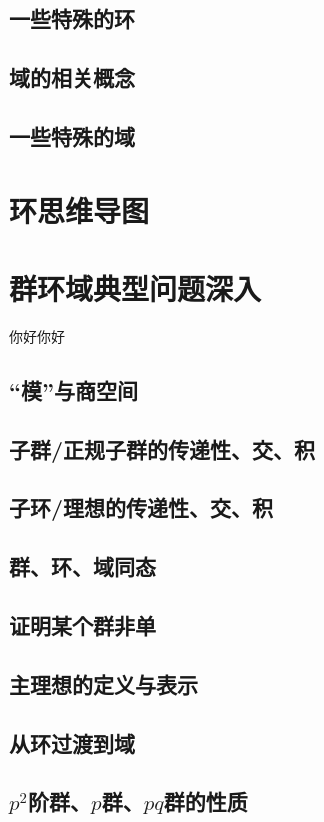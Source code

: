 \documentclass[zihao=-4,UTF8]{report}
\begin{document}
\subsection{一些特殊的环}
\subsection{域的相关概念}
\subsection{一些特殊的域}

\section{环思维导图}

\section{群环域典型问题深入}
你好你好
\subsection{“模”与商空间}
\subsection{子群/正规子群的传递性、交、积}
\subsection{子环/理想的传递性、交、积}
\subsection{群、环、域同态}
\subsection{证明某个群非单}
\subsection{主理想的定义与表示}
\subsection{从环过渡到域}
\subsection{$p^2$阶群、$p$群、$pq$群的性质}
\end{document}
